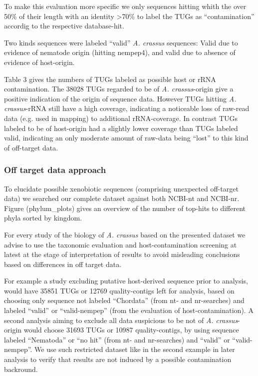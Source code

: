 \documentclass[10pt]{bmc_article}
\newenvironment{bmcformat}{\begin{raggedright}\baselineskip20pt\sloppy\setboolean{publ}{false}}{\end{raggedright}\baselineskip20pt\sloppy}
\begin{document}
\begin{bmcformat}
To make this evaluation more specific we only sequences hitting whith
the over 50\% of their length with an identity >70\% to label the
TUGs as ``contamination'' accordig to the respective database-hit.

Two kinds sequences were labeled ``valid'' \textit{A. crassus}
sequences: Valid due to evidence of nematode origin (hitting nempep4),
and valid due to absence of evidence of host-origin.

Table 3 gives the numbers of TUGs labeled as possible host or rRNA
contamination. The 38028 TUGs regarded to be of
\textit{A. crassus}-origin give a positive indication of the origin of
sequence data. However TUGs hitting \textit{A. crassus}-rRNA still
have a high coverage, indicating a noticeable loss of raw-read data
(e.g. used in mapping) to additional rRNA-coverage. In contrast
TUGs labeled to be of host-origin had a slightly lower coverage than
TUGs labeled valid, indicating an only moderate amount of raw-data
being ``lost'' to this kind of off-target data.

\subsubsection*{Off target data approach}

To elucidate possible xenobiotic sequences (comprising unexpected
off-target data) we searched our complete dataset against both NCBI-nt
and NCBI-nr. Figure (phylum\_plots) gives an overview of the number of
top-hits to different phyla sorted by kingdom.

For every study of the biology of \textit{A. crassus} based on the
presented dataset we advise to use the taxonomic evaluation and
host-contamination screening at latest at the stage of interpretation
of results to avoid misleading conclusions based on differences in
off target data.

For example a study excluding putative host-derived sequence prior to
analysis, would have 35851 TUGs or 12769
quality-contigs left for analysis, based on choosing only sequence not
labeled ``Chordata'' (from nt- and nr-searches) and labeled ``valid''
or ``valid-nempep'' (from the evaluation of host-contamination). A
second analysis aiming to exclude all data suspicious to be not of
\textit{A. crassus}-origin would choose 31693 TUGs or
10987 quality-contigs, by using sequence labeled
``Nematoda'' or ``no hit'' (from nt- and nr-searches) and ``valid'' or
``valid-nempep''. We use such restricted dataset like in the second
example in later analysis to verify that results are not induced by a
possible contamination backround.


\end{bmcformat}
\end{document}
